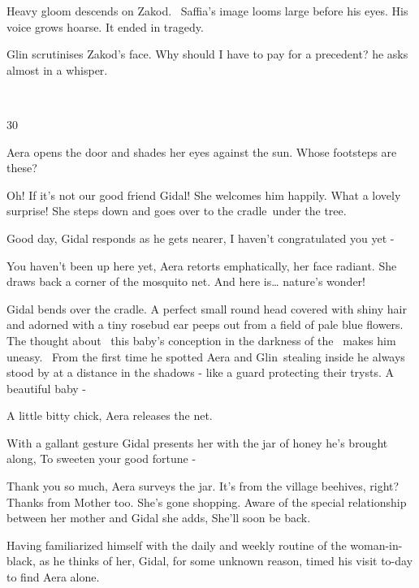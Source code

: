 \documentclass[12pt]{book}
\begin{document}
Heavy gloom descends on Zakod. \ Saffia's image looms large before his eyes. His voice grows hoarse. {\textquotedbl}It
ended in tragedy.{\textquotedbl}

Glin scrutinises Zakod's face. {\textquotedbl}Why should{ }I have to pay for a
precedent?{\textquotedbl} he asks almost in a whisper.

~

30~~

Aera opens the door and shades her eyes against the sun. Whose footsteps are these?

{\textquotedbl}Oh! If it's not our good friend Gidal!{\textquotedbl} She welcomes him happily. {\textquotedbl}What a
lovely surprise!{\textquotedbl} She steps down and goes over to the
cradle~under{ }the tree.

{\textquotedbl}Good day,{\textquotedbl} Gidal responds as he gets nearer, {\textquotedbl}I haven't congratulated you yet
-{\textquotedbl}

{\textquotedbl}You haven't been up here yet,{\textquotedbl} Aera retorts emphatically, her face radiant. She draws back
a corner of the mosquito net. {\textquotedbl}And here is{\dots} nature's wonder!{\textquotedbl} ~

Gidal bends over the cradle. A perfect small round head covered with shiny hair and adorned with a tiny rosebud ear
peeps out from a field of pale blue flowers. The thought about \ this baby's conception in the darkness of the \ makes
him uneasy. ~From the first time he spotted Aera and Glin~stealing inside he always stood by at a distance in the
shadows - like a guard protecting their trysts. {\textquotedbl}A beautiful baby -{\textquotedbl}

{\textquotedbl}A little bitty chick,{\textquotedbl} Aera releases the net.

With a gallant gesture Gidal presents her with the jar of honey he's brought along, {\textquotedbl}To sweeten your good
fortune -{\textquotedbl}

{\textquotedbl}Thank you so much,{\textquotedbl} Aera surveys the jar. {\textquotedbl}It's from the village beehives,
right? Thanks from Mother too. She's gone shopping.{\textquotedbl} Aware of the special relationship between her mother
and Gidal she adds, {\textquotedbl}She'll soon be back.{\textquotedbl}

Having familiarized himself with the daily and weekly routine of the woman-in-black, as he thinks of her, Gidal, for
some unknown reason, timed his visit to-day to find Aera alone.
\end{document}
